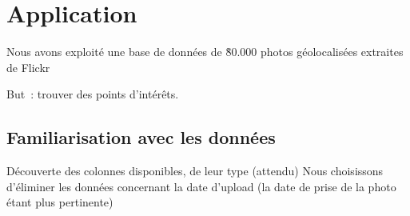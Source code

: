 \chapter{Application}

    Nous avons exploité une base de données de \~80.000 photos géolocalisées extraites de Flickr

    But~: trouver des points d’intérêts.

\section{Familiarisation avec les données}
    Découverte des colonnes disponibles, de leur type (attendu)
    Nous choisissons d'éliminer les données concernant la date d'upload (la date de prise de la photo étant plus pertinente)

